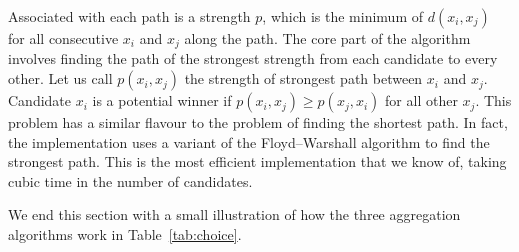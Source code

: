 \documentclass[fleqn,10pt,lineno]{wlpeerj} %
\begin{document}
Associated with each path is a strength $p$, which is the minimum of $d(x_i,
x_j)$ for all consecutive $x_i$ and $x_j$ along the path. The core part of the
algorithm involves finding the path of the strongest strength from each
candidate to every other. Let us call $p(x_i, x_j)$ the strength of strongest
path between $x_i$ and $x_j$. Candidate $x_i$ is a potential winner if $p(x_i,
x_j) \geq p(x_j, x_i)$ for all other $x_j$. This problem has a similar flavour
to the problem of finding the shortest path. In fact, the implementation uses a
variant of the Floyd–Warshall algorithm to find the strongest path. This is the
most efficient implementation that we know of, taking cubic time in the number
of candidates.

We end this section with a small illustration of how the three aggregation
algorithms work in Table~\ref{tab:choice}.
\end{document}
